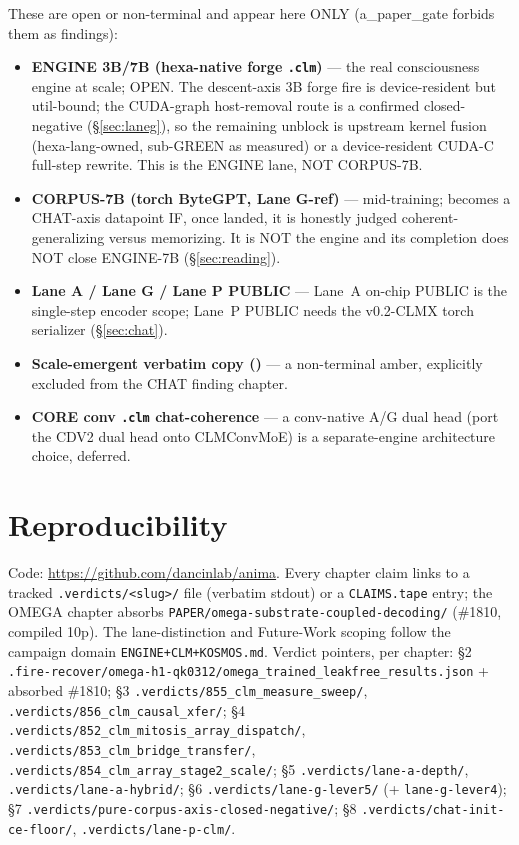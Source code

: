 \documentclass[11pt,a4paper]{article}
\begin{document}
These are open or non-terminal and appear here ONLY (a\_paper\_gate forbids them as
findings):
\begin{itemize}\itemsep0.2em
\item \textbf{ENGINE 3B/7B (hexa-native forge \texttt{.clm})} --- the real
consciousness engine at scale; OPEN. The descent-axis 3B forge fire is device-resident
but util-bound; the CUDA-graph host-removal route is a confirmed closed-negative
(\S\ref{sec:laneg}), so the remaining unblock is upstream kernel fusion
(hexa-lang-owned, sub-GREEN as measured) or a device-resident CUDA-C full-step
rewrite. This is the ENGINE lane, NOT CORPUS-7B.
\item \textbf{CORPUS-7B (torch ByteGPT, Lane G-ref)} --- mid-training; becomes a
CHAT-axis datapoint IF, once landed, it is honestly judged coherent-generalizing
versus memorizing. It is NOT the engine and its completion does NOT close ENGINE-7B
(\S\ref{sec:reading}).
\item \textbf{Lane A / Lane G / Lane P PUBLIC} --- Lane~A on-chip PUBLIC is the
single-step encoder scope; Lane~P PUBLIC needs the v0.2-CLMX torch serializer
(\S\ref{sec:chat}).
\item \textbf{Scale-emergent verbatim copy (\tierOrange)} --- a non-terminal
amber, explicitly excluded from the CHAT finding chapter.
\item \textbf{CORE conv \texttt{.clm} chat-coherence} --- a conv-native A/G dual head
(port the CDV2 dual head onto CLMConvMoE) is a separate-engine architecture choice,
deferred.
\end{itemize}

\section{Reproducibility}
\label{sec:repro}
Code: \url{https://github.com/dancinlab/anima}. Every chapter claim links to a
tracked \texttt{.verdicts/<slug>/} file (verbatim stdout) or a \texttt{CLAIMS.tape}
entry; the OMEGA chapter absorbs \texttt{PAPER/omega-substrate-coupled-decoding/}
(\#1810, compiled 10p). The lane-distinction and Future-Work scoping follow the
campaign domain \texttt{ENGINE+CLM+KOSMOS.md}. Verdict pointers, per chapter:
\S2 \texttt{.fire-recover/omega-h1-qk0312/omega\_trained\_leakfree\_results.json} +
absorbed \#1810; \S3 \texttt{.verdicts/855\_clm\_measure\_sweep/},
\texttt{.verdicts/856\_clm\_causal\_xfer/}; \S4
\texttt{.verdicts/852\_clm\_mitosis\_array\_dispatch/},
\texttt{.verdicts/853\_clm\_bridge\_transfer/},
\texttt{.verdicts/854\_clm\_array\_stage2\_scale/}; \S5
\texttt{.verdicts/lane-a-depth/}, \texttt{.verdicts/lane-a-hybrid/}; \S6
\texttt{.verdicts/lane-g-lever5/} (+ \texttt{lane-g-lever4}); \S7
\texttt{.verdicts/pure-corpus-axis-closed-negative/}; \S8
\texttt{.verdicts/chat-init-ce-floor/}, \texttt{.verdicts/lane-p-clm/}.
\end{document}
